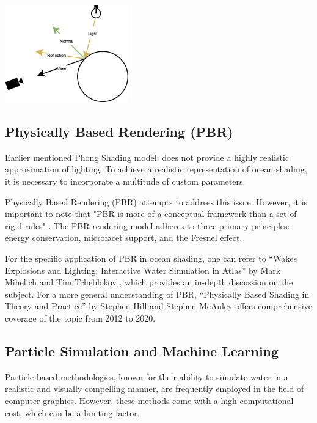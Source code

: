 \begin{minipage}{1\textwidth}
    \centering
    \includegraphics[width=0.4\textwidth]{"images/phong_graph.png"}
    \label{fig:phong_graph}
\end{minipage}

\subsection{Physically Based Rendering (PBR)}
Earlier mentioned Phong Shading model, does not provide a highly realistic approximation of lighting. To achieve a realistic representation of ocean shading, it is necessary to incorporate a multitude of custom parameters.

Physically Based Rendering (PBR) attempts to address this issue. However, it is important to note that "PBR is more of a conceptual framework than a set of rigid rules" \cite{wilson2017}. The PBR rendering model adheres to three primary principles: energy conservation, microfacet support, and the Fresnel effect.

For the specific application of PBR in ocean shading, one can refer to “Wakes Explosions and Lighting: Interactive Water Simulation in Atlas” by Mark Mihelich and Tim Tcheblokov \cite{mark2021}, which provides an in-depth discussion on the subject. For a more general understanding of PBR, “Physically Based Shading in Theory and Practice” by Stephen Hill and Stephen McAuley \cite{stephan2012} offers comprehensive coverage of the topic from 2012 to 2020.

\subsection{Particle Simulation and Machine Learning}
Particle-based methodologies, known for their ability to simulate water in a realistic and visually compelling manner, are frequently employed in the field of computer graphics. However, these methods come with a high computational cost, which can be a limiting factor.

